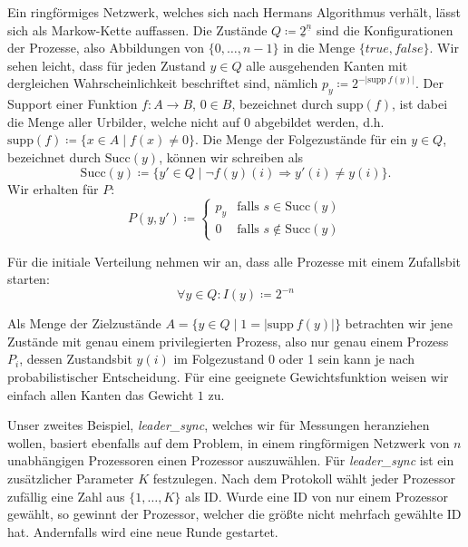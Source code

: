 \documentclass[a4paper]{article}
\newcommand{\mc}{Markow-Kette}
\theoremstyle{nonumberplain}
\begin{document}
Ein ringförmiges Netzwerk, welches sich nach Hermans Algorithmus verhält, lässt sich als \mc{} \mcex{} auffassen. Die Zustände $Q \coloneqq \underline{2}^{\underline{n}}$ sind die Konfigurationen der Prozesse, also Abbildungen von $\{0, \dots , n-1\}$ in die Menge $\{true, false\}$. Wir sehen leicht, dass für jeden Zustand $y \in Q$ alle ausgehenden Kanten mit dergleichen Wahrscheinlichkeit beschriftet sind, nämlich $p_y \coloneqq 2^{-|\mathrm{supp}\>f(y)|}$. Der Support einer Funktion $f : A \to B$, $0\in B$, bezeichnet durch $\mathrm{supp}(f)$, ist dabei die Menge aller Urbilder, welche nicht auf $0$ abgebildet werden, d.h. $\mathrm{supp}(f)\coloneqq\{x \in A \mid f(x) \neq 0\}$. Die Menge der Folgezustände für ein $y \in Q$, bezeichnet durch $\mathrm{Succ}(y)$, können wir schreiben als
\[
	\mathrm{Succ}(y) \coloneqq \{ y' \in Q \mid \neg f(y)(i) \Rightarrow y'(i) \neq y(i) \}\text{.}
\]
Wir erhalten für $P$:
\begin{equation}
	P(y,y') \coloneqq \begin{cases}
		p_y & \text{falls } s\in \mathrm{Succ}(y)\\
		0 & \text{falls } s\notin \mathrm{Succ}(y)
	\end{cases}
\end{equation}

Für die initiale Verteilung nehmen wir an, dass alle Prozesse mit einem Zufallsbit starten:
\begin{equation*}
	\forall y \in Q : I(y) \coloneqq 2^{-n}
\end{equation*}

Als Menge der Zielzustände  $A = \{ y \in Q \mid 1 = |\mathrm{supp}\>f(y)|\}$ betrachten wir jene Zustände mit genau einem privilegierten Prozess, also nur genau einem Prozess $P_i$, dessen Zustandsbit $y(i)$ im Folgezustand 0 oder 1 sein kann je nach probabilistischer Entscheidung. Für eine geeignete Gewichtsfunktion weisen wir einfach allen Kanten das Gewicht $1$ zu.

\bigskip
Unser zweites Beispiel, \textit{leader\_sync}, welches wir für Messungen heranziehen wollen, basiert ebenfalls auf dem Problem, in einem ringförmigen Netzwerk von $n$ unabhängigen Prozessoren einen Prozessor auszuwählen. Für \textit{leader\_sync} ist ein zusätzlicher Parameter $K$ festzulegen. Nach dem Protokoll wählt jeder Prozessor zufällig eine Zahl aus $\{1, \dots , K\}$ als ID. Wurde eine ID von nur einem Prozessor gewählt, so gewinnt der Prozessor, welcher die größte nicht mehrfach gewählte ID hat. Andernfalls wird eine neue Runde gestartet.
\end{document}

